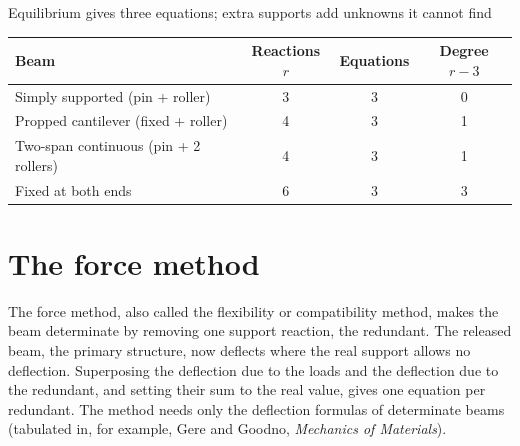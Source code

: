 \documentclass[
  beameroptions={aspectratio=169,ignorenonframetext,11pt},
  articleoptions={11pt,a4paper},
]{beamerswitch}
\begin{document}
\begin{frame}{Equilibrium gives three equations; extra supports add unknowns it cannot find}
  \centering\small
  \begin{tabular}{lccc}
    \toprule
    Beam & Reactions $r$ & Equations & Degree $r-3$ \\
    \midrule
    Simply supported (pin + roller) & 3 & 3 & 0 \\ \pause
    Propped cantilever (fixed + roller) & 4 & 3 & 1 \\ \pause
    Two-span continuous (pin + 2 rollers) & 4 & 3 & 1 \\ \pause
    Fixed at both ends & 6 & 3 & 3 \\
    \bottomrule
  \end{tabular}
  \par\bigskip
\end{frame}

\section{The force method}

The force method, also called the flexibility or compatibility method, makes
the beam determinate by removing one support reaction, the redundant. The
released beam, the primary structure, now deflects where the real support
allows no deflection. Superposing the deflection due to the loads and the
deflection due to the redundant, and setting their sum to the real value,
gives one equation per redundant. The method needs only the deflection formulas
of determinate beams (tabulated in, for example, Gere and Goodno,
\emph{Mechanics of Materials}).
\end{document}
